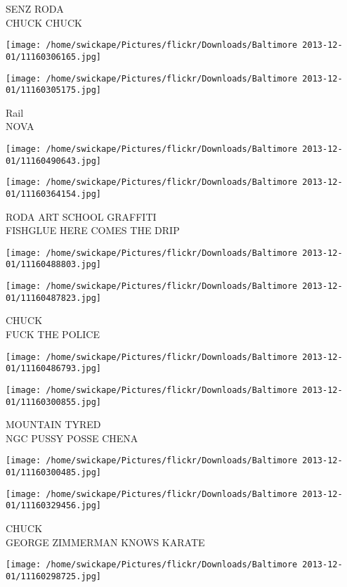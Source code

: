 \documentclass[10pt,letterpaper]{article}
\begin{document}
SENZ RODA\\
CHUCK CHUCK
\pagebreak

\texttt{[image: /home/swickape/Pictures/flickr/Downloads/Baltimore 2013-12-01/11160306165.jpg]}

\vspace{0.25in}
\texttt{[image: /home/swickape/Pictures/flickr/Downloads/Baltimore 2013-12-01/11160305175.jpg]}

Rail\\
NOVA
\pagebreak

\texttt{[image: /home/swickape/Pictures/flickr/Downloads/Baltimore 2013-12-01/11160490643.jpg]}

\vspace{0.25in}
\texttt{[image: /home/swickape/Pictures/flickr/Downloads/Baltimore 2013-12-01/11160364154.jpg]}

RODA ART SCHOOL GRAFFITI\\
FISHGLUE HERE COMES THE DRIP
\pagebreak

\texttt{[image: /home/swickape/Pictures/flickr/Downloads/Baltimore 2013-12-01/11160488803.jpg]}

\vspace{0.25in}
\texttt{[image: /home/swickape/Pictures/flickr/Downloads/Baltimore 2013-12-01/11160487823.jpg]}

CHUCK\\
FUCK THE POLICE
\pagebreak

\texttt{[image: /home/swickape/Pictures/flickr/Downloads/Baltimore 2013-12-01/11160486793.jpg]}

\vspace{0.25in}
\texttt{[image: /home/swickape/Pictures/flickr/Downloads/Baltimore 2013-12-01/11160300855.jpg]}

MOUNTAIN TYRED\\
NGC PUSSY POSSE CHENA
\pagebreak

\texttt{[image: /home/swickape/Pictures/flickr/Downloads/Baltimore 2013-12-01/11160300485.jpg]}

\vspace{0.25in}
\texttt{[image: /home/swickape/Pictures/flickr/Downloads/Baltimore 2013-12-01/11160329456.jpg]}

CHUCK\\
GEORGE ZIMMERMAN KNOWS KARATE
\pagebreak

\texttt{[image: /home/swickape/Pictures/flickr/Downloads/Baltimore 2013-12-01/11160298725.jpg]}
\end{document}
